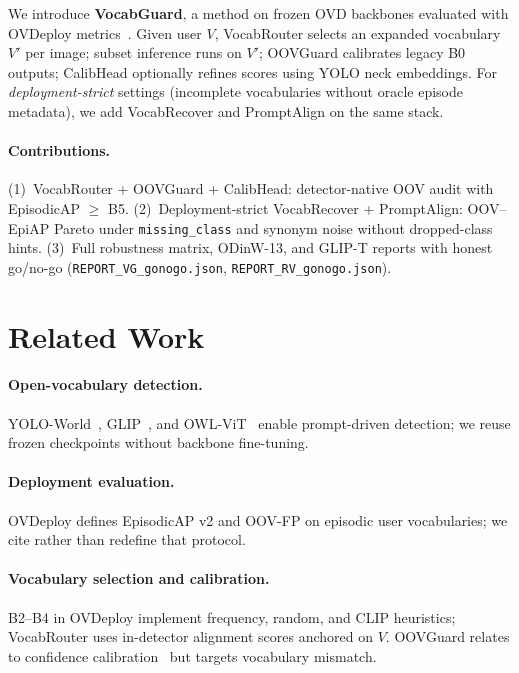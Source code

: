 \documentclass[10pt,twocolumn,letterpaper]{article}
\begin{document}
We introduce \textbf{VocabGuard}, a method on frozen OVD backbones evaluated with OVDeploy metrics~\cite{ovdeploy2026}.
Given user $V$, VocabRouter selects an expanded vocabulary $V'$ per image; subset inference runs on $V'$; OOVGuard calibrates legacy B0 outputs; CalibHead optionally refines scores using YOLO neck embeddings.
For \emph{deployment-strict} settings (incomplete vocabularies without oracle episode metadata), we add VocabRecover and PromptAlign on the same stack.

\paragraph{Contributions.}
(1)~VocabRouter + OOVGuard + CalibHead: detector-native OOV audit with EpisodicAP $\ge$ B5.
(2)~Deployment-strict VocabRecover + PromptAlign: OOV--EpiAP Pareto under \texttt{missing\_class} and synonym noise without dropped-class hints.
(3)~Full robustness matrix, ODinW-13, and GLIP-T reports with honest go/no-go (\texttt{REPORT\_VG\_gonogo.json}, \texttt{REPORT\_RV\_gonogo.json}).

\section{Related Work}
\label{sec:related}

\paragraph{Open-vocabulary detection.}
YOLO-World~\cite{cheng2024yoloworld}, GLIP~\cite{li2022glip}, and OWL-ViT~\cite{minderer2022owlvit} enable prompt-driven detection; we reuse frozen checkpoints without backbone fine-tuning.

\paragraph{Deployment evaluation.}
OVDeploy defines EpisodicAP v2 and OOV-FP on episodic user vocabularies; we cite rather than redefine that protocol.

\paragraph{Vocabulary selection and calibration.}
B2--B4 in OVDeploy implement frequency, random, and CLIP heuristics; VocabRouter uses in-detector alignment scores anchored on $V$.
OOVGuard relates to confidence calibration~\cite{guo2017calibration} but targets vocabulary mismatch.
\end{document}
